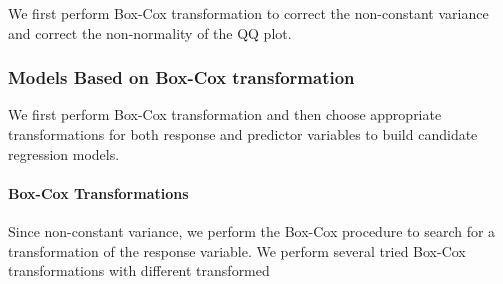 \documentclass[
]{book}
\begin{document}
We first perform Box-Cox transformation to correct the non-constant variance and correct the non-normality of the QQ plot.

\hypertarget{models-based-on-box-cox-transformation}{%
\subsubsection{Models Based on Box-Cox transformation}\label{models-based-on-box-cox-transformation}}

We first perform Box-Cox transformation and then choose appropriate transformations for both response and predictor variables to build candidate regression models.

\hypertarget{box-cox-transformations}{%
\paragraph{Box-Cox Transformations}\label{box-cox-transformations}}

Since non-constant variance, we perform the Box-Cox procedure to search for a transformation of the response variable. We perform several tried Box-Cox transformations with different transformed
\end{document}
